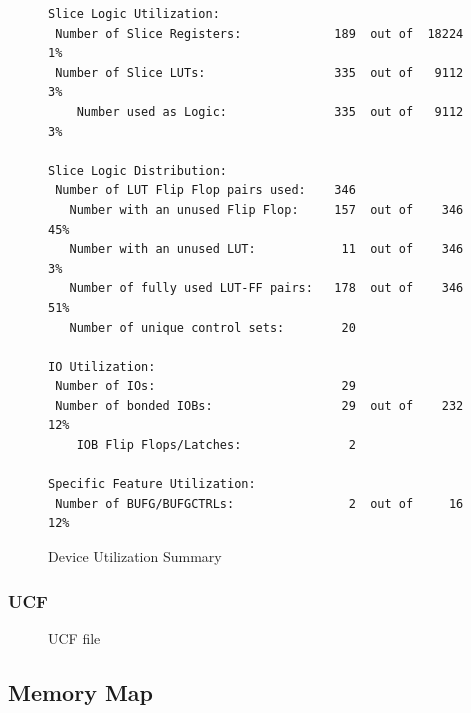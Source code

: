 \documentclass{article}
\begin{document}
	   		\begin{figure}[H]  
	   			\caption{Device Utilization Summary}
	   			\begin{lstlisting}
Slice Logic Utilization: 
 Number of Slice Registers:             189  out of  18224     1%  
 Number of Slice LUTs:                  335  out of   9112     3%  
    Number used as Logic:               335  out of   9112     3%  

Slice Logic Distribution: 
 Number of LUT Flip Flop pairs used:    346
   Number with an unused Flip Flop:     157  out of    346    45%  
   Number with an unused LUT:            11  out of    346     3%  
   Number of fully used LUT-FF pairs:   178  out of    346    51%  
   Number of unique control sets:        20

IO Utilization: 
 Number of IOs:                          29
 Number of bonded IOBs:                  29  out of    232    12%  
    IOB Flip Flops/Latches:               2

Specific Feature Utilization:
 Number of BUFG/BUFGCTRLs:                2  out of     16    12%  
	   			\end{lstlisting}
	   		\end{figure}

      \newpage
	   	\subsubsection{UCF}
        \begin{figure}[H]
          \caption{UCF file}
          
        \end{figure}

    \newpage
  	\subsection{Memory Map}
\end{document}
